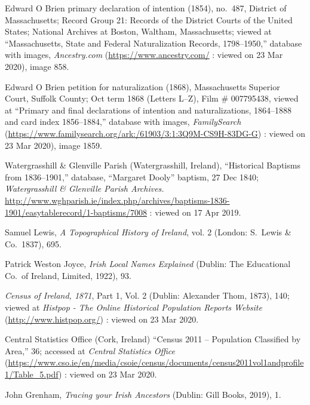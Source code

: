 \begin{thebibliography}{99}
\raggedright

	Edward O Brien primary declaration of intention (1854), no.\ 487, 
	District of Massachusetts; 
	Record Group 21: Records of the District Courts of the United States; 
	National Archives at Boston, Waltham, Massachusetts;
	viewed at ``Massachusetts, State and Federal Naturalization Records, 1798--1950,''
	database with images, \textit{Ancestry.com} (\url{https://www.ancestry.com/} : viewed on 23 Mar 2020), image 858.
	
	Edward O Brien petition for naturalization (1868), 
	Massachusetts Superior Court, Suffolk County; 
	Oct term 1868 (Letters L--Z), Film \# 007795438,
	viewed at ``Primary and final declarations of intention and naturalizations, 1864--1888 and card index 1856--1884,''
	database with images, \textit{FamilySearch} (\url{https://www.familysearch.org/ark:/61903/3:1:3Q9M-CS9H-83DG-G}) : viewed on 23 Mar 2020), image 1859.
	
	Watergrasshill \& Glenville Parish (Watergrasshill, Ireland), ``Historical Baptisms from 1836--1901,'' database, ``Margaret Dooly'' baptism, 27 Dec 1840; \textit{Watergrasshill \& Glenville Parish Archives.} \url{http://www.wghparish.ie/index.php/archives/baptisms-1836-1901/easytablerecord/1-baptisms/7008} : viewed on 17 Apr 2019.
	
	Samuel Lewis, \textit{A Topographical History of Ireland}, vol. 2 (London: S.\ Lewis \& Co.\, 1837), 695.
	
	Patrick Weston Joyce, \textit{Irish Local Names Explained} (Dublin: The Educational Co.\ of Ireland, Limited, 1922), 93.
	
	\textit{Census of Ireland, 1871}, Part 1, Vol. 2 (Dublin: Alexander Thom, 1873), 140; viewed at \textit{Histpop - The Online Historical Population Reports Website} (\url{http://www.histpop.org/}) : viewed on 23 Mar 2020.
	
	Central Statistics Office (Cork, Ireland) ``Census 2011 -- Population Classified by Area,'' 36; accessed at \textit{Central Statistics Office} (\url{https://www.cso.ie/en/media/csoie/census/documents/census2011vol1andprofile1/Table_5.pdf}) : viewed on 23 Mar 2020.
	
	John Grenham, \textit{Tracing your Irish Ancestors} (Dublin: Gill Books, 2019), 1.
	

\end{thebibliography}
